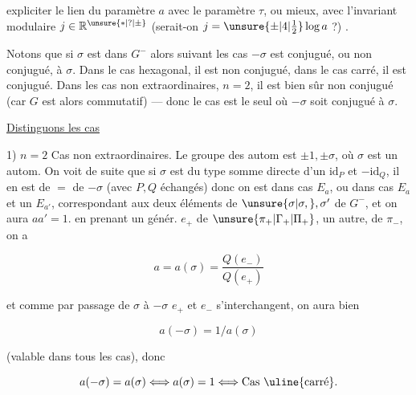
expliciter le lien du paramètre $a$ avec le paramètre $\tau$, ou mieux, avec l'invariant modulaire $j\in\mathbb R^{\unsure{*|?|\pm}}$ (serait-on $j=\unsure{\pm|4|\tfrac12}\log a$ ?) .


 Notons que si $\sigma$ est dans $G^-$ alors  suivant les cas $-\sigma$ est conjugué, ou non conjugué, à $\sigma$. Dans le cas hexagonal, il est non conjugué, dans le cas carré, il est conjugué. Dans les cas non extraordinaires, $n=2$, il est bien sûr non conjugué (car $G$ est alors commutatif) --- donc le cas   est le seul où $-\sigma$  soit  conjugué à $\sigma$. 

\uline{Distinguons les cas}

1) \uline{$n=2$} Cas non extraordinaires. Le groupe des autom est $\pm1,\pm\sigma$, où $\sigma$ est un  autom. On voit de suite que si $\sigma$ est du type somme directe d'un $\mathrm{id}_P$ et $-\mathrm{id}_Q$, il en est de $=$ de $-\sigma$ (avec $P,Q$ échangés) donc on est dans cas $E_a$, ou   dans cas $E_a$ et un $E_{a'}$, correspondant aux deux éléments de $\unsure{\sigma|\sigma,},\sigma'$ de $G^-$, et on aura $aa'=1$.  en prenant un génér. $e_+$ de $\unsure{\pi_+|\Gamma_+|\Pi_+}$, un autre,  de $\pi_-$, on a

\[
a=a(\sigma)=\frac{Q(e_-)}{Q(e_+)}
\]

et comme par passage de $\sigma$ à $-\sigma$  $e_+$ et $e_-$ s'interchangent, on aura bien


\[
a(-\sigma)=1/a(\sigma)
\]

(valable dans tous les cas), donc

\[
a(-\sigma)=a(\sigma)\Longleftrightarrow a(\sigma)=1\Longleftrightarrow\text{Cas \uline{carré}}.
\]
